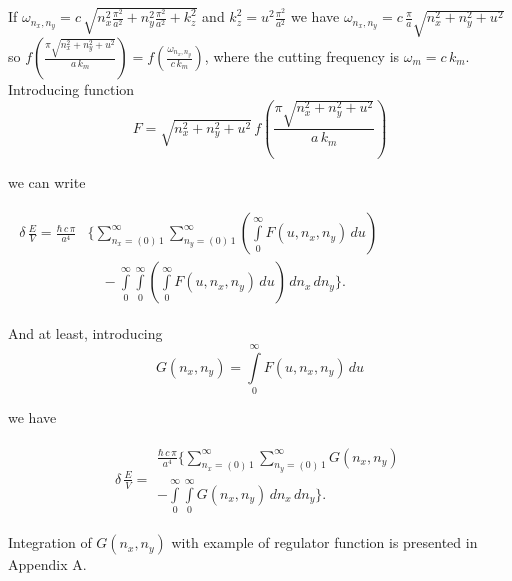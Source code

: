 \documentclass[twoside, 10pt]{article}
\begin{document}
\begin{multicols}{2}
    If \(\omega _{n_x,n_y} = c\,\sqrt{n_x^2\frac{\pi^2}{a^2}+n_y^2\frac{\pi^2}{a^2}+k_z^2}\)
and \(k_z^2 = u^2 \frac{\pi^2}{a^2}\) we have
\(\omega _{n_x,n_y} = c \, \frac{\pi}{a} \sqrt{n_x^2+n_y^2+u^2}\) so
\(f\left(\frac{\pi\sqrt{n_x^2 + n_y^2+u^2}}{a\,k_m}\right) = f\left(\frac{\omega _{n_x,n_y}}{c\,k_m}\right)\),
where the cutting frequency is \(\omega_m = c\,k_m\).
    Introducing function
\noindent
\begin{equation} \label{eq:4}
F = %
\sqrt{n_x^2 + n_y^2+u^2}\,
f\left(\frac{\pi\sqrt{n_x^2 + n_y^2+u^2}}{a\,k_m}\right)
\end{equation}

    we can write

\noindent
$\begin{array}{c}
\begin{array}{ll}
\delta\,\frac{E}{V} =
\frac{\hbar\,c\,\pi}{a^4}
&\Bigg\{
\sum\limits_{n_x=\left(0\right)\,1}^{\infty}
\sum\limits_{n_y=\left(0\right)\,1}^{\infty}
\left(\int\limits_{0}^{\infty}F\left(u, n_x, n_y\right)\,d{u}\right)
\\
\, & \,\,\,\,\,\, - \int\limits_{0}^{\infty}
\int\limits_{0}^{\infty}
\left(\int\limits_{0}^{\infty}F\left(u, n_x, n_y\right)\,d{u}\right)
\,d{n_x}\,d{n_y}
\Bigg\}.
\end{array}
\end{array}$

    And at least, introducing
\noindent
\begin{equation} \label{eq:5}
G\left(n_x, n_y\right) = \int\limits_{0}^{\infty}F\left(u, n_x, n_y\right)\,d{u}
\end{equation}

    we have

    \begin{equation} \label{eq:6}
\begin{array}{lr}
\delta\,\frac{E}{V} =
\begin{array}{c}
 \frac{\hbar\,c\,\pi}{a^4} \Bigg\{
\sum\limits_{n_x=\left(0\right)\,1}^{\infty}
\sum\limits_{n_y=\left(0\right)\,1}^{\infty}
G\left(n_x, n_y\right)
\\
- \int\limits_{0}^{\infty}
\int\limits_{0}^{\infty}
G\left(n_x, n_y\right)
\,d{n_x}\,d{n_y}
\Bigg\}.
\end{array}
\end{array}
\end{equation}

Integration of \(G\left(n_x, n_y\right)\) with example of regulator
function is presented in Appendix A.


\end{multicols}
\end{document}
